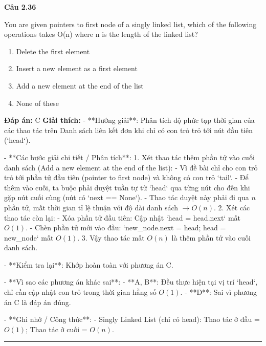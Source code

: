 \documentclass[11pt,a4paper]{article}
\newenvironment{question}[1]{%
  \par\vspace{1em}\noindent\textbf{\large Câu #1}\par\vspace{0.4em}
}{%
  \par\vspace{1em}\hrule\vspace{0.6em}
}
\newenvironment{choices}{%
  \begin{enumerate}[label=\textbf{\Alph*.},leftmargin=2.2em,itemsep=2pt,topsep=3pt]
}{%
  \end{enumerate}
}
\newcommand{\choice}{\item}
\begin{document}
\begin{question}{2.36}
You are given pointers to first node of a singly linked list, which of the following operations takes O(n) where n is the length of the linked list?
\begin{choices}
\choice Delete the first element
\choice Insert a new element as a first element
\choice Add a new element at the end of the list
\choice None of these
\end{choices}
\textbf{Đáp án:} C
\textbf{Giải thích:} - **Hướng giải**:
  Phân tích độ phức tạp thời gian của các thao tác trên Danh sách liên kết đơn khi chỉ có con trỏ trỏ tới nút đầu tiên (`head`).

- **Các bước giải chi tiết / Phân tích**:
  1. Xét thao tác thêm phần tử vào cuối danh sách (Add a new element at the end of the list):
     - Vì đề bài chỉ cho con trỏ trỏ tới phần tử đầu tiên (pointer to first node) và không có con trỏ `tail`.
     - Để thêm vào cuối, ta buộc phải duyệt tuần tự từ `head` qua từng nút cho đến khi gặp nút cuối cùng (nút có `next == None`).
     - Thao tác duyệt này phải đi qua \(n\) phần tử, mất thời gian tỉ lệ thuận với độ dài danh sách \(\rightarrow O(n)\).
  2. Xét các thao tác còn lại:
     - Xóa phần tử đầu tiên: Cập nhật `head = head.next` mất \(O(1)\).
     - Chèn phần tử mới vào đầu: `new_node.next = head; head = new_node` mất \(O(1)\).
  3. Vậy thao tác mất \(O(n)\) là thêm phần tử vào cuối danh sách.

- **Kiểm tra lại**:
  Khớp hoàn toàn với phương án C.

- **Vì sao các phương án khác sai**:
  - **A, B**: Đều thực hiện tại vị trí `head`, chỉ cần cập nhật con trỏ trong thời gian hằng số \(O(1)\).
  - **D**: Sai vì phương án C là đáp án đúng.

- **Ghi nhớ / Công thức**:
  - Singly Linked List (chỉ có head): Thao tác ở đầu = \(O(1)\); Thao tác ở cuối = \(O(n)\).
\end{question}
\end{document}
